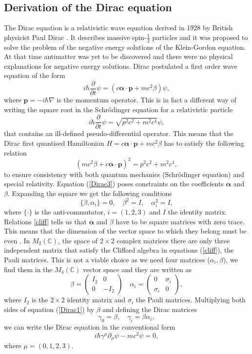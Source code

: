 \documentclass[a4paper,11pt]{article}
\newcommand{\beq}{\begin{equation}}
\newcommand{\eeq}{\end{equation}}
\newcommand{\p}{\mathbf{p}}
\begin{document}
\subsection{Derivation of the Dirac equation}
\label{sec:dirac}
The Dirac equation is a relativistic wave equation derived in 1928 by British physicist Paul Dirac \cite{DiracP}. It describes massive spin-$\frac{1}2$ particles and it was proposed to solve the problem of the negative energy solutions of the Klein-Gordon equation. At that time antimatter was yet to be discovered and there were no physical explanations for negative energy solutions. Dirac postulated a first order wave equation of the form 
\beq \label{Dirac1}
i \hbar \frac{\partial}{\partial t} \psi = ( c \boldsymbol{\alpha} \cdot \mathbf{p} + m c^2 \beta ) \psi,
\eeq
where $\p=- i \hbar \nabla$ is the momentum operator.  This is in fact a different way of writing the square root in the Schr\"odinger equation for a relativistic particle 
\beq  \label{Dirac2}
i \hbar \frac{\partial}{\partial t} \psi = \sqrt{p^2c^2 + m^2 c^4} \psi,
\eeq
that contains an ill-defined pseudo-differential operator. This means that the Dirac first quantised Hamiltonian $H =  c \boldsymbol{\alpha} \cdot \mathbf{p} + m c^2 \beta $ has to satisfy the following relation 
\beq  \label{Dirac3}
  (m c^2 \beta + c \boldsymbol{\alpha} \cdot \mathbf{p}) ^2 =  p^2c^2 + m^2 c^4, 
\eeq
to ensure consistency with both quantum mechanics (Schr\"odinger equation) and special relativity. Equation (\ref{Dirac3}) poses constraints on the coefficients $\boldsymbol \alpha$ and $\beta$. Expanding the square we get the following conditions 
\beq \label{cliff}
\{\beta, \alpha_i\} = 0, \quad \beta^2 = I, \quad \alpha_i^2 = I,
\eeq
where $\{\cdot \}$ is the anti-commutator, $i = (1,2,3)$ and $I$ the identity matrix. Relations \ref{cliff} tells us that $\boldsymbol \alpha$ and $\beta$ have to be square matrices with zero trace.  This means that the dimension of the vector space to which they belong must be even \cite{bd}. In $M_2(\mathbb{C})$, the space of $2 \times 2$ complex matrices there are only three independent matrix that satisfy the Clifford algebra in equations (\ref{cliff}), the Pauli matrices. This is not a viable choice as we need four matrices ($\alpha_i,\beta$), we find them in the $M_4(\mathbb{C})$ vector space and they are written as 
\beq
\beta = \left(\begin{array}{cc}I_2 & 0 \\0 & -I_2\end{array}\right) \quad \alpha_i = \left(\begin{array}{cc}0& \sigma_i \\ \sigma_i & 0\end{array}\right),
\eeq
where $I_2$ is the $2 \times 2$ identity matrix and $\sigma_i$ the Pauli matrices. Multiplying both sides of equation (\ref{Dirac1}) by $\beta$ and defining the Dirac matrices 
\beq
\gamma_0 = \beta, \quad \gamma_i = \beta \alpha_i,
\eeq
we can write the Dirac equation in the conventional form
\beq \label{Dirac4}
i \hbar \gamma^\mu \partial_\mu \psi - m c^2 \psi = 0,
\eeq
where $\mu = (0,1,2,3)$. 
\end{document}
